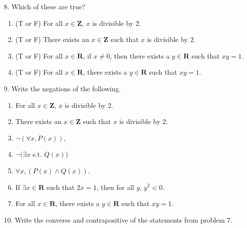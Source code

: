 \documentclass[12pt, reqno]{amsart}
\begin{document}
8. Which of these are true? 
\vspace{10pt}
\begin{enumerate}
\item (T or F) For all $x \in \mathbf{Z}$, $x$ is divisible by 2.
\item (T or F) There exists an $x \in \mathbf{Z}$ such that $x$ is divisible by $2$.
\item (T or F) For all $x \in \mathbf{R}$, if $x \neq 0$, then there exists a $y \in \mathbf{R}$ such that $xy = 1$.
\item (T or F) For all $x \in \mathbf{R}$, there exists a $y \in \mathbf{R}$ such that $xy = 1$.
\end{enumerate}
\vspace{20pt}

9. Write the negations of the following.
\vspace{10pt}
\begin{enumerate}
\item For all $x \in \mathbf{Z}$, $x$ is divisible by 2.
\item There exists an $x \in \mathbf{Z}$ such that $x$ is divisible by $2$.
\item $\neg(\forall x, P(x))$,
\item $\neg( \exists x $ s.t. $Q(x)$)
\item $\forall x, (P(x) \wedge Q(x))$.
\item If $\exists x \in \mathbf{R}$ such that $2x = 1$, then for all $y$, $y^2 < 0$.  
\item For all $x \in \mathbf{R}$, there exists a $y \in \mathbf{R}$ such that $xy = 1$.
\end{enumerate}
\vspace{20pt}

10. Write the converse and contrapositive of the statements from problem 7.
\end{document}
